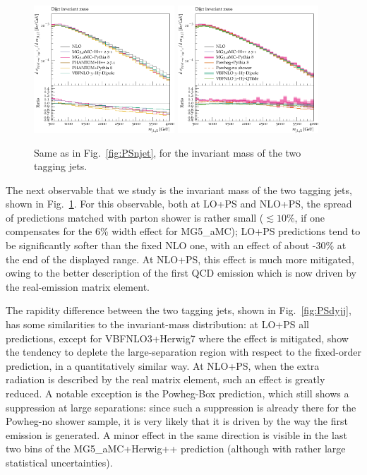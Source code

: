 \begin{figure}[hbt]
\centering
\includegraphics[width=0.47\textwidth]{figures/LOPS/m_jj.pdf}
\includegraphics[width=0.47\textwidth]{figures/NLOPS/m_jj.pdf}
\caption{Same as in Fig.~\protect\ref{fig:PSnjet}, for the invariant mass of the two tagging jets.}
\label{fig:PSmjj}
\end{figure}

The next observable that we study is the invariant mass of the two tagging jets, shown in Fig.~\ref{fig:PSmjj}. For this observable, both at LO+PS and NLO+PS,
the spread of predictions matched with parton shower is rather small
($\lesssim 10\%$, if one compensates for the 6\% width effect for {\sc MG5\_aMC}); LO+PS predictions tend to be significantly softer than the fixed NLO one, with an effect of
about -30\% at the end of the displayed range. At NLO+PS, this effect is much more mitigated, owing to the better description of the first QCD emission which is now driven by the real-emission matrix element.
 
The rapidity difference between the two tagging jets, shown in Fig.~\ref{fig:PSdyjj}, has some similarities to the invariant-mass distribution: at LO+PS all predictions,
except for {\sc VBFNLO3+Herwig7} where the effect is mitigated, show the tendency to deplete the large-separation region with respect to the fixed-order prediction, in a
quantitatively similar way. At NLO+PS, when the extra radiation is described by the real matrix element, such an effect is greatly reduced. A notable
exception is the {\sc Powheg-Box} prediction, which still shows a suppression at large separations: since such a suppression is already there for the {\sc Powheg-no shower} sample,
it is very likely that it is driven by the way the first emission is generated. A minor effect in the same direction is visible in the last two bins of the
{\sc MG5\_aMC+Herwig++} prediction (although with rather large statistical uncertainties).



